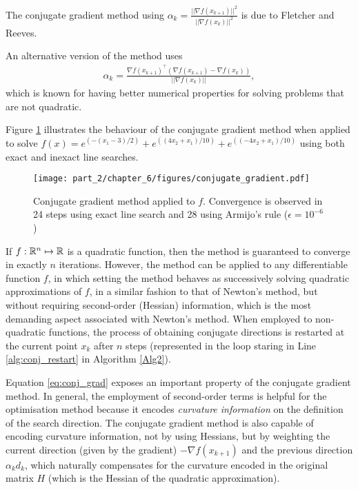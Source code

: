 The conjugate gradient method using $\alpha_k = \frac{||\nabla f(x_{k+1})||^2}{||\nabla f(x_k)||^2}$ is due to Fletcher and Reeves. 

	An alternative version of the method uses
	\begin{align*}
		\alpha_k = \frac{\nabla f(x_{k+1})^\top (\nabla f(x_{k+1}) - \nabla f(x_k))}{||\nabla f(x_k)||},
	\end{align*}
	which is known for having better numerical properties for solving  problems that are not quadratic.
	
Figure \ref{fig:conjugate_gradient} illustrates the behaviour of the conjugate gradient method when applied to solve $f(x)=e^{(-(x_1-3)/2)} + e^{((4x_2 + x_1)/10)} + e^{((-4x_2 + x_1)/10)}$ using both exact and inexact line searches. 
%
\begin{figure}
	\texttt{[image: part\_2/chapter\_6/figures/conjugate\_gradient.pdf]}
	\caption{Conjugate gradient method applied to $f$. Convergence is observed in 24 steps using exact line search and 28 using Armijo's rule ($\epsilon = 10^{-6}$)} \label{fig:conjugate_gradient}	
\end{figure}

If $f: \mathbb{R}^n \mapsto \mathbb{R}$ is a quadratic function, then the method is guaranteed to converge in exactly $n$ iterations. However, the method can be applied to any differentiable function $f$, in which setting the method behaves as successively solving quadratic approximations of $f$, in a similar fashion to that of Newton's method, but without requiring second-order (Hessian) information, which is the most demanding aspect associated with Newton's method. When employed to non-quadratic functions, the process of obtaining conjugate directions is restarted at the current point $x_k$ after $n$ steps (represented in the loop staring in Line \ref{alg:conj_restart} in Algorithm \ref{Alg2}).

Equation \eqref{eq:conj_grad} exposes an important property of the conjugate gradient method. In general, the employment of second-order terms is helpful for the optimisation method because it encodes \emph{curvature information} on the definition of the search direction. The conjugate gradient method is also capable of encoding curvature information, not by using Hessians, but by weighting the current direction (given by the gradient) $-\nabla f(x_{k+1})$ and the previous direction $\alpha_kd_k$, which naturally compensates for the curvature encoded in the original matrix $H$ (which is the Hessian of the quadratic approximation).


